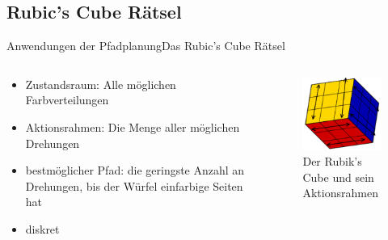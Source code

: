 \documentclass[t,aspectratio=169,dvipsnames]{beamer}
\begin{document}
\subsection{Rubic's Cube Rätsel}
\begin{frame}{Anwendungen der Pfadplanung}{Das Rubic's Cube Rätsel}
	\begin{columns}
		\begin{column}[T]{0.5\textwidth}
				\begin{itemize}[<+->]
					\item Zustandsraum: Alle möglichen Farbverteilungen
					\item Aktionsrahmen: Die Menge aller möglichen Drehungen
					\item bestmöglicher Pfad: die geringste Anzahl an Drehungen, bis der Würfel einfarbige Seiten hat
					\item diskret
				\end{itemize}
		\end{column}
		\begin{column}[T]{0.5\textwidth}
			\begin{figure}
				\includegraphics[width=4.5cm]{images/img229_a.png}
				\caption{Der Rubik's Cube und sein Aktionsrahmen }
			\end{figure}
		\end{column}
	\end{columns}
\end{frame}
\end{document}
